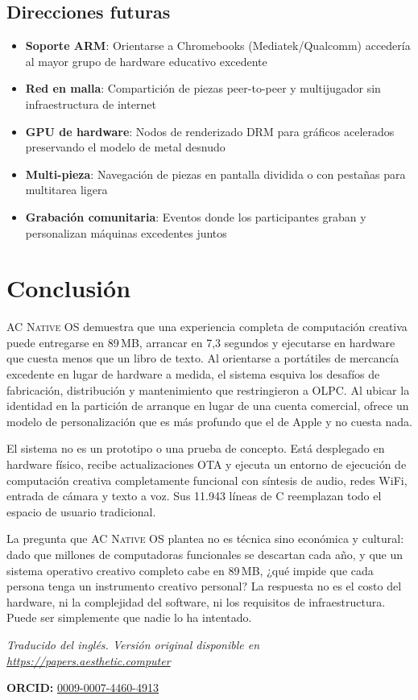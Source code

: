 \documentclass[10pt,letterpaper,twocolumn]{article}
\newcommand{\acos}{\textsc{AC Native OS}}
\begin{document}
\subsection{Direcciones futuras}

\begin{itemize}
  \item \textbf{Soporte ARM}: Orientarse a Chromebooks (Mediatek/Qualcomm) accedería al mayor grupo de hardware educativo excedente
  \item \textbf{Red en malla}: Compartición de piezas peer-to-peer y multijugador sin infraestructura de internet
  \item \textbf{GPU de hardware}: Nodos de renderizado DRM para gráficos acelerados preservando el modelo de metal desnudo
  \item \textbf{Multi-pieza}: Navegación de piezas en pantalla dividida o con pestañas para multitarea ligera
  \item \textbf{Grabación comunitaria}: Eventos donde los participantes graban y personalizan máquinas excedentes juntos
\end{itemize}

\section{Conclusión}

\acos{} demuestra que una experiencia completa de computación creativa puede entregarse en 89\,MB, arrancar en 7,3 segundos y ejecutarse en hardware que cuesta menos que un libro de texto. Al orientarse a portátiles de mercancía excedente en lugar de hardware a medida, el sistema esquiva los desafíos de fabricación, distribución y mantenimiento que restringieron a OLPC. Al ubicar la identidad en la partición de arranque en lugar de una cuenta comercial, ofrece un modelo de personalización que es más profundo que el de Apple y no cuesta nada.

El sistema no es un prototipo o una prueba de concepto. Está desplegado en hardware físico, recibe actualizaciones OTA y ejecuta un entorno de ejecución de computación creativa completamente funcional con síntesis de audio, redes WiFi, entrada de cámara y texto a voz. Sus 11.943 líneas de C reemplazan todo el espacio de usuario tradicional.

La pregunta que \acos{} plantea no es técnica sino económica y cultural: dado que millones de computadoras funcionales se descartan cada año, y que un sistema operativo creativo completo cabe en 89\,MB, ¿qué impide que cada persona tenga un instrumento creativo personal? La respuesta no es el costo del hardware, ni la complejidad del software, ni los requisitos de infraestructura. Puede ser simplemente que nadie lo ha intentado.

\vspace{0.5em}
\noindent\textit{Traducido del inglés. Versión original disponible en \url{https://papers.aesthetic.computer}}

\vspace{0.5em}
\noindent\textbf{ORCID:} \href{https://orcid.org/0009-0007-4460-4913}{0009-0007-4460-4913}



\end{document}
